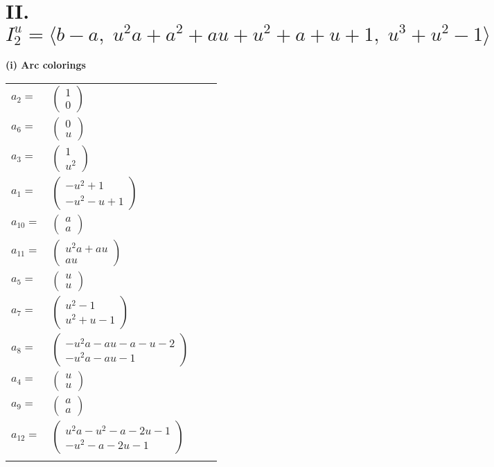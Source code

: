 \documentclass[1p]{elsarticle_modified}
\theoremstyle{definition}
\begin{document}
\centering \section*{II. $I^u_{2}= \langle b- a,\;u^2 a+a^2+a u+u^2+a+u+1,\;u^3+u^2-1 \rangle$}
\flushleft \textbf{(i) Arc colorings}\\
\begin{tabular}{m{7pt} m{180pt} m{7pt} m{180pt} }
\flushright $a_{2}=$&$\begin{pmatrix}1\\0\end{pmatrix}$ \\
\flushright $a_{6}=$&$\begin{pmatrix}0\\u\end{pmatrix}$ \\
\flushright $a_{3}=$&$\begin{pmatrix}1\\u^2\end{pmatrix}$ \\
\flushright $a_{1}=$&$\begin{pmatrix}- u^2+1\\- u^2- u+1\end{pmatrix}$ \\
\flushright $a_{10}=$&$\begin{pmatrix}a\\a\end{pmatrix}$ \\
\flushright $a_{11}=$&$\begin{pmatrix}u^2 a+a u\\a u\end{pmatrix}$ \\
\flushright $a_{5}=$&$\begin{pmatrix}u\\u\end{pmatrix}$ \\
\flushright $a_{7}=$&$\begin{pmatrix}u^2-1\\u^2+u-1\end{pmatrix}$ \\
\flushright $a_{8}=$&$\begin{pmatrix}- u^2 a- a u- a- u-2\\- u^2 a- a u-1\end{pmatrix}$ \\
\flushright $a_{4}=$&$\begin{pmatrix}u\\u\end{pmatrix}$ \\
\flushright $a_{9}=$&$\begin{pmatrix}a\\a\end{pmatrix}$ \\
\flushright $a_{12}=$&$\begin{pmatrix}u^2 a- u^2- a-2 u-1\\- u^2- a-2 u-1\end{pmatrix}$\\&\end{tabular}
\end{document}
